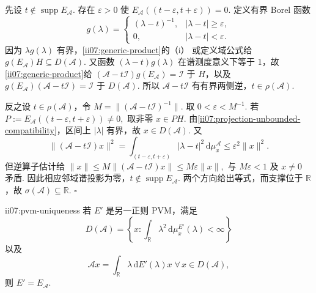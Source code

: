 \begin{FAProof}
先设 \(\displaystyle t\notin\operatorname{supp}E_{\mathcal A}\). 存在 \(\displaystyle\varepsilon>0\) 使
\(\displaystyle E_{\mathcal A}((t-\varepsilon,t+\varepsilon))=0.\)
定义有界 Borel 函数
\[
g(\lambda)
=
\begin{cases}
(\lambda-t)^{-1},&|\lambda-t|\geqslant\varepsilon,\\
0,&|\lambda-t|<\varepsilon.
\end{cases}
\]
因为 \(\displaystyle\lambda g(\lambda)\) 有界，\autoref{ii07:generic-product}的（i） 或定义域公式给 \(\displaystyle g(E_{\mathcal A})H\subseteq D(\mathcal A)\). 又函数 \(\displaystyle(\lambda-t)g(\lambda)\) 在谱测度意义下等于 \(\displaystyle1\)，故\autoref{ii07:generic-product}给
\(\displaystyle (\mathcal A-t\mathcal I)g(E_{\mathcal A})=\mathcal I\)
于 \(\displaystyle H\)，以及
\(\displaystyle g(E_{\mathcal A})(\mathcal A-t\mathcal I)=\mathcal I\)
于 \(\displaystyle D(\mathcal A)\). 所以 \(\displaystyle\mathcal A-t\mathcal I\) 有有界两侧逆，\(\displaystyle t\in\rho(\mathcal A)\).

反之设 \(\displaystyle t\in\rho(\mathcal A)\)，令
\(\displaystyle M=\|(\mathcal A-t\mathcal I)^{-1}\|.\)
取 \(\displaystyle0<\varepsilon<M^{-1}\). 若
\(\displaystyle P:=E_{\mathcal A}((t-\varepsilon,t+\varepsilon))\neq0,\)
取非零 \(\displaystyle x\in PH\). 由\autoref{ii07:projection-unbounded-compatibility}，区间上 \(\displaystyle|\lambda|\) 有界，故 \(\displaystyle x\in D(\mathcal A)\). 又
\[
\|(\mathcal A-t\mathcal I)x\|^2
=
\int_{(t-\varepsilon,t+\varepsilon)}|\lambda-t|^2\,\mathrm{d}\mu_x^{\mathcal A}
\leqslant
\varepsilon^2\|x\|^2.
\]
但逆算子估计给
\(\displaystyle \|x\| \leqslant M\|(\mathcal A-t\mathcal I)x\| \leqslant M\varepsilon\|x\|,\)
与 \(\displaystyle M\varepsilon<1\) 及 \(\displaystyle x\neq0\) 矛盾. 因此相应邻域谱投影为零，\(\displaystyle t\notin\operatorname{supp}E_{\mathcal A}\). 两个方向给出等式，而支撑位于 \(\displaystyle\mathbb R\)，故 \(\displaystyle\sigma(\mathcal A)\subseteq\mathbb R\).
\hfill\(\square\)
\end{FAProof}

\begin{FAProposition}[B][无界自伴谱测度的唯一性]{ii07:pvm-uniqueness}
若 \(\displaystyle E'\) 是另一正则 PVM，满足
\[
D(\mathcal A)
=
\left\{
 x:\int_{\mathbb R}\lambda^2\,\mathrm{d}\mu_x^{E'}(\lambda)<\infty
\right\}
\]
以及
\[
\mathcal Ax
=
\int_{\mathbb R}\lambda\,\mathrm{d}E'(\lambda)x
\;
\forall\,x\in D(\mathcal A),
\]
则 \(\displaystyle E'=E_{\mathcal A}\).
\end{FAProposition}

